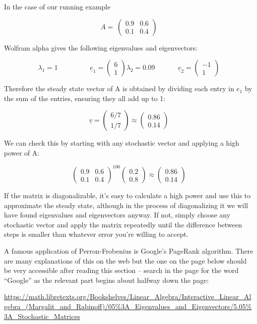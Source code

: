 \documentclass[oneside,english]{amsbook}
\numberwithin{section}{chapter}
\theoremstyle{plain}
\theoremstyle{definition}
\begin{document}
In the case of our running example

\[A = \ \begin{pmatrix}
	0.9 & 0.6 \\
	0.1 & 0.4
\end{pmatrix}\]

Wolfram alpha gives the following eigenvalues and eigenvectors:

\[{\lambda_{1} = 1\ \ \ \ \ \ \ \ \ \ \ \ \ \ \ \ \ \ \ \ \ {\underline{e}}_{1} = \begin{pmatrix}
		6 \\
		1
	\end{pmatrix}
}{\lambda_{2} = 0.09\ \ \ \ \ \ \ \ \ \ \ \ \ \ \ {\underline{e}}_{2} = \begin{pmatrix}
		- 1 \\
		1
\end{pmatrix}}\]

Therefore the steady state vector of A is obtained by dividing each
entry in $e_1$ by the sum of the entries, ensuring
they all add up to 1:

\[\underline{v} = \begin{pmatrix}
	6/7 \\
	1/7
\end{pmatrix} \approx \begin{pmatrix}
	0.86 \\
	0.14
\end{pmatrix}\]

\[
\]We can check this by starting with any stochastic vector and applying
a high power of A:

\[\begin{pmatrix}
	0.9 & 0.6 \\
	0.1 & 0.4
\end{pmatrix}^{100}\begin{pmatrix}
	0.2 \\
	0.8
\end{pmatrix} \approx \begin{pmatrix}
	0.86 \\
	0.14
\end{pmatrix}\]

If the matrix is diagonalizable, it's easy to calculate a high power and
use this to approximate the steady state, although in the process of
diagonalizing it we will have found eigenvalues and eigenvectors anyway.
If not, simply choose any stochastic vector and apply the matrix
repeatedly until the difference between steps is smaller than whatever
error you're willing to accept.

A famous application of Perron-Frobenius is Google's PageRank algorithm.
There are many explanations of this on the web but the one on the page
below should be very accessible after reading this section -- search in
the page for the word ``Google'' as the relevant part begins about
halfway down the page:

\url{https://math.libretexts.org/Bookshelves/Linear_Algebra/Interactive_Linear_Algebra_(Margalit_and_Rabinoff)/05\%3A_Eigenvalues_and_Eigenvectors/5.05\%3A_Stochastic_Matrices}
\end{document}
